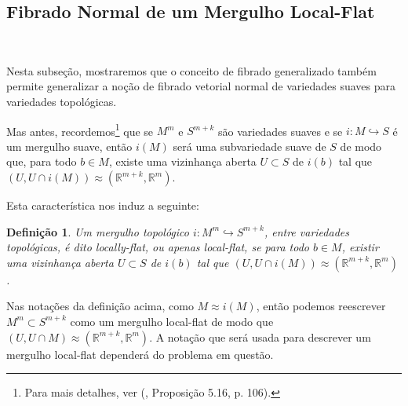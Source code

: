 \documentclass[12pt,oneside]{book} %
\newtheorem{defi}   {\hspace{0.5cm}Defini\c c\~ao}[chapter]
\newcommand{\R}{\mathbb{R}}
\begin{document}
\subsection{Fibrado Normal de um Mergulho Local-Flat}\label{secao_fht_normal}

\

\par Nesta subseção, mostraremos que o conceito de fibrado generalizado também permite generalizar a noção de fibrado vetorial normal de variedades suaves para variedades topológicas.

\par Mas antes, recordemos\footnote{Para mais detalhes, ver (\cite{lee_s}, Proposição 5.16, p. 106).} que se $M^{m}$ e $S^{m+k}$ são variedades suaves e se $i:M\hookrightarrow S$ é um mergulho suave, então $i(M)$ será uma subvariedade suave de $S$ de modo que, para todo $b\in M$, existe uma vizinhança aberta $U\subset S$ de $i(b)$ tal que $(U,U\cap i(M))\approx (\R^{m+k},\R^{m})$.

\par Esta característica nos induz a seguinte:

\begin{defi}
	Um mergulho topológico $i:M^{m}\hookrightarrow S^{m+k}$, entre variedades topológicas, é dito locally-flat, ou apenas local-flat, se para todo $b\in M$, existir uma vizinhança aberta $U\subset S$ de $i(b)$ tal que $(U,U\cap i(M))\approx (\R^{m+k},\R^{m})$.
\end{defi}

\par Nas notações da definição acima, como $M\approx i(M)$, então podemos reescrever $M^{m}\subset S^{m+k}$ como um mergulho local-flat de modo que $(U,U\cap M)\approx (\R^{m+k},\R^{m})$. A notação que será usada para descrever um mergulho local-flat dependerá do problema em questão.
\end{document}
